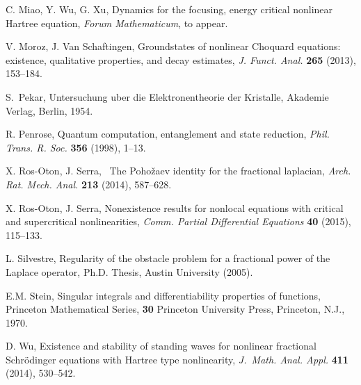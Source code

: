 \documentclass[10pt]{amsart}
\numberwithin{equation}{section}
\begin{document}
\begin{thebibliography}{99}
C. Miao, Y. Wu, G. Xu,
Dynamics for the focusing, energy critical nonlinear Hartree equation,
{\em Forum Mathematicum}, to appear.

V. Moroz, J. Van Schaftingen, 
Groundstates of nonlinear Choquard equations: existence, qualitative properties,
and decay estimates,
{\em J. Funct. Anal.} {\bf 265} (2013), 153--184.

S.\ Pekar, Untersuchung uber die Elektronentheorie der Kristalle, Akademie Verlag, Berlin, 1954.

R. Penrose, 
{ Quantum computation, entanglement and state reduction}, 
{\em Phil. Trans. R. Soc.} {\bf 356} (1998), 1--13.

X. Ros-Oton, J. Serra,
{\ The Poho\v zaev identity for the fractional laplacian},
{\em Arch. Rat. Mech. Anal.} {\bf 213} (2014), 587--628.

X. Ros-Oton, J. Serra,
{ Nonexistence results for nonlocal equations with critical and supercritical nonlinearities}, 
{\em Comm. Partial Differential Equations} {\bf 40} (2015), 115--133.

L. Silvestre, 
Regularity of the obstacle problem for a fractional power of the Laplace operator, Ph.D. Thesis, Austin University (2005). 

E.M. Stein, 
Singular integrals and differentiability properties of functions, Princeton Mathematical Series, 
{\bf 30} Princeton University Press, Princeton, N.J., 1970. 

D. Wu,
Existence and stability of standing waves 
for nonlinear fractional Schr\"odinger equations
with Hartree type nonlinearity,
{\em J.\ Math. Anal. Appl.} {\bf 411} (2014), 530--542.

\end{thebibliography}
\end{document}
